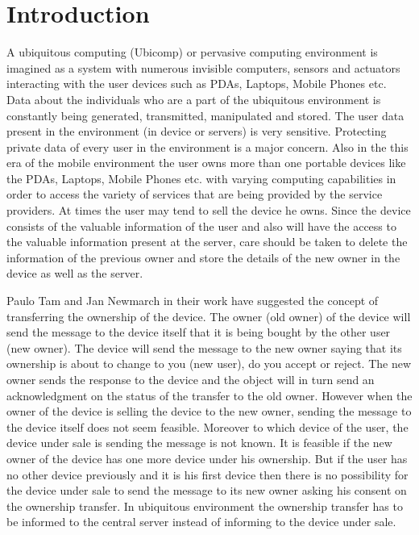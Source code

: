 \documentclass[letterpaper]{article}
\begin{document}
\section{Introduction}
A ubiquitous computing (Ubicomp) or pervasive computing environment is imagined as a system with numerous invisible computers, sensors and actuators interacting with the user devices such as PDAs, Laptops, Mobile Phones etc. Data about the individuals who are a part of the ubiquitous environment is constantly being generated, transmitted, manipulated and stored. The user data present in the environment (in device or servers) is very sensitive. Protecting private data of every user in the environment is a major concern. Also in the this era of the mobile environment the user owns more than one portable devices like the PDAs, Laptops, Mobile Phones etc. with varying computing capabilities in order to access the variety of services that are being provided by the service providers. At times the user may tend to sell the device he owns. Since the device consists of the valuable information of the user and also will have the access to the valuable information present at the server, care should be taken to delete the information of the previous owner and store the details of the new owner in the device as well as the server.
\par
Paulo Tam and Jan Newmarch \cite{1} in their work have suggested the concept of transferring the ownership of the device. The owner (old owner) of the device will send the message to the device itself that it is being bought by the other user (new owner). The device will send the message to the new owner saying that its ownership is about to change to you (new user), do you accept or reject. The new owner sends the response to the device and the object will in turn send an acknowledgment on the status of the transfer to the old owner. However when the owner of the device is selling the device to the new owner, sending the message to the device itself does not seem feasible. Moreover to which device of the user, the device under sale is sending the message is not known. It is feasible if the new owner of the device has one more device under his ownership. But if the user has no other device previously and it is his first device then there is no possibility for the device under sale to send the message to its new owner asking his consent on the ownership transfer. In ubiquitous environment the ownership transfer has to be informed to the central server instead of informing to the device under sale. 
\par
\end{document}
